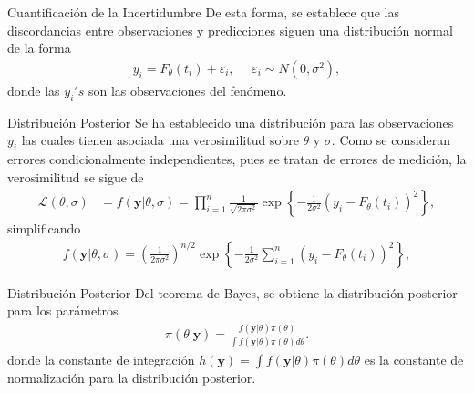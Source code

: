 \documentclass[10pt,aspectratio=169]{beamer}
\begin{document}
\begin{frame}{Cuantificación de la Incertidumbre}
  De esta forma, se establece que las discordancias entre observaciones y predicciones siguen una distribución normal de la forma
  \begin{align*}
      y_i = F_{\theta} (t_i) + \varepsilon_i, \:\:\:\:\:\: \varepsilon_i \sim N(0,\sigma^2),
  \end{align*}
  donde las $y_i's$ son las observaciones del fenómeno.
\end{frame}

\begin{frame}{Distribución Posterior}
  Se ha establecido una distribución para las observaciones $y_i$ las cuales tienen asociada una verosimilitud sobre $\theta$ y $\sigma$. Como se consideran errores condicionalmente independientes, pues se tratan de errores de medición, la verosimilitud se sigue de
  \begin{align*}
      \mathcal{L}(\theta,\sigma) &= f(\mathbf{y}|\theta,\sigma) = \prod_{i = 1}^{n} \frac{1}{\sqrt{2\pi \sigma^2}} \exp \left \{ -\frac{1}{2\sigma^2}\left(y_i - F_{\theta}(t_i)\right)^2 \right \} , 
  \end{align*}
  simplificando
  \begin{align}
      f(\mathbf{y}|\theta,\sigma) = \left(\frac{1}{2\pi \sigma^2}\right) ^{n/2}\exp \left \{  -\frac{1}{2\sigma^2}\sum_{i = 1}^{n} \left(y_i - F_{\theta}(t_i)\right)^2 \right \},
      \label{2.2.03}
  \end{align}
\end{frame}


\begin{frame}{Distribución Posterior} 
  Del teorema de Bayes, se obtiene la distribución posterior para los parámetros
  \begin{align}
      \pi(\theta | \mathbf{y})  = \frac{f(\mathbf{y}|\theta)\pi(\theta)}{\int f(\mathbf{y}|\theta)\pi(\theta)d \theta}.
      \label{2.2.04}
  \end{align}
  donde la constante de integración $h(\mathbf{y}) = \int f(\mathbf{y}|\theta)\pi(\theta)d \theta$ es la constante de normalización para la distribución posterior. 
\end{frame}





\end{document}
